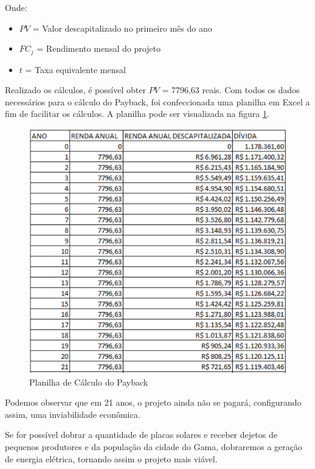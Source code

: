 Onde:
\begin{itemize}
\item $PV$ = Valor descapitalizado no primeiro mês do ano
\item $FC_{j}$ = Rendimento mensal do projeto
\item $t$ = Taxa equivalente mensal 
\end{itemize}

Realizado os cálculos, é possível obter $PV$ = 7796,63 reais.
Com todos os dados necessários para o cálculo do Payback, foi confeccionada uma planilha em Excel a fim de facilitar os cálculos. A planilha pode ser visualizada na figura \ref{fig:payback}.

\begin{figure}[!h]
\centering
\includegraphics[width=.5\textwidth]{figuras/payback.png}
\caption{Planilha de Cálculo do Payback}
\label{fig:payback}
\end{figure}

Podemos observar que em 21 anos, o projeto ainda não se pagará, configurando assim, uma inviabilidade econômica. 

Se for possível dobrar a quantidade de placas solares e receber dejetos de pequenos produtores e da população da cidade do Gama, dobraremos a geração de energia elétrica, tornando assim o projeto mais viável. 

